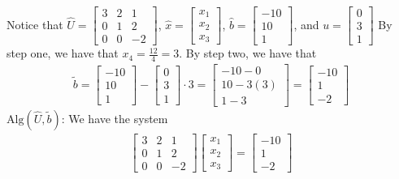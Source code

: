 \documentclass{report}
\begin{document}
    Notice that $\hat{U} = \begin{bmatrix} 3 & 2 & 1 \\ 0 & 1 & 2 \\ 0 & 0 & -2 \end{bmatrix} $, $\hat{x} = \begin{bmatrix} x_{1} \\ x_{2} \\ x_{3} \end{bmatrix} $, $\hat{b} = \begin{bmatrix} -10 \\ 10 \\ 1 \end{bmatrix} $, and $u = \begin{bmatrix}
        0 \\ 3 \\ 1
    \end{bmatrix} $
    \bigbreak \noindent 
    By step one, we have that $x_{4} = \frac{12}{4} = 3$.
    \bigbreak \noindent 
    By step two, we have that
    \begin{align*}
        \tilde{b} = \begin{bmatrix}
            -10 \\ 10 \\ 1
        \end{bmatrix}
        -
        \begin{bmatrix}
           0 \\ 3 \\ 1 
        \end{bmatrix}
        \cdot 3
        =
        \begin{bmatrix}
            -10 - 0 \\
            10-3(3) \\
            1-3
        \end{bmatrix}
        = \begin{bmatrix}
            -10 \\
            1 \\
            -2
        \end{bmatrix}
    \end{align*}
    $\text{Alg}(\hat{U}, \tilde{b})$: We have the system
    \begin{align*}
        \begin{bmatrix}
            3 & 2 & 1 \\
            0 & 1 & 2 \\
            0 & 0 & -2
        \end{bmatrix}
        \begin{bmatrix}
            x_{1} \\ x_{2} \\ x_{3}
        \end{bmatrix}
         = 
         \begin{bmatrix}
             -10 \\ 1 \\ -2
         \end{bmatrix}
    \end{align*}
\end{document}
